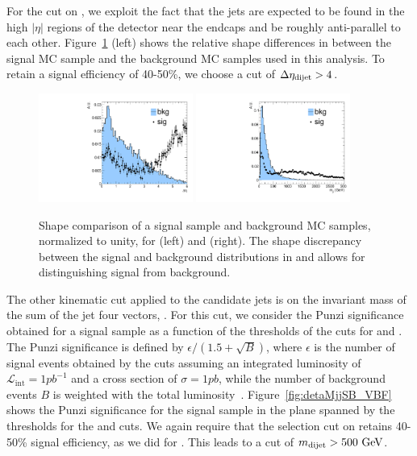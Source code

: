 For the cut on \DetaVBF, we exploit the fact that the \VBF jets are expected to be found in the high $|\eta|$ regions of the detector near the endcaps and be roughly anti-parallel to each other.
Figure~\ref{fig:detaSB_VBF} (left) shows the relative shape differences in \DetaVBF between the \VBF\RadtoWW signal MC sample and the background MC samples used in this analysis.
To retain a signal efficiency of 40-50\%, we choose a cut of $\DetaVBF>4$.

\begin{figure}[htbp]
  \centering
  \includegraphics[width=0.45\textwidth]{fig/eventSelection/detaSB.pdf}
  \includegraphics[width=0.45\textwidth]{fig/eventSelection/mjjSB.pdf}
  \caption{
    Shape comparison of a \VBF\RadtoWW signal sample and background MC samples, normalized to unity, for \DetaVBF (left) and \mjjVBF (right).
    The shape discrepancy between the \VBF signal and background distributions in \DetaVBF and \mjjVBF allows for distinguishing signal from background.
  }
  \label{fig:detaSB_VBF}
\end{figure}

The other kinematic cut applied to the \VBF candidate jets is on the invariant mass of the sum of the \VBF jet four vectors, \mjjVBF.
For this cut, we consider the Punzi significance obtained for a \VBF signal sample as a function of the thresholds of the cuts for \DetaVBF and \mjjVBF.
The Punzi significance is defined by $\epsilon/(1.5+\sqrt{B})$, where $\epsilon$ is the number of signal events obtained by the cuts assuming an integrated luminosity of $\mathcal{L}_\mathrm{int}=1\unit{pb^{-1}}$ and a cross section of $\sigma=1\unit{pb}$, while the number of background events $B$ is weighted with the total luminosity~\cite{Punzi:2003bu}.
Figure~\ref{fig:detaMjjSB_VBF} shows the Punzi significance for the \VBF\RadtoWW signal sample in the plane spanned by the thresholds for the \DetaVBF and \mjjVBF cuts.
We again require that the selection cut on \mjjVBF retains 40-50\% signal efficiency, as we did for \DetaVBF.
This leads to a cut of $\mjjVBF>500\unit{GeV}$.

